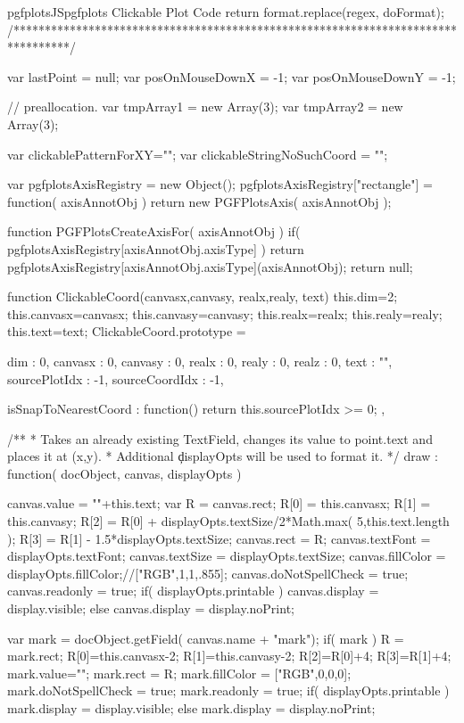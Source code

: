 {{\begin{insDLJS}[processAnnotatedPlot]{pgfplotsJS}{pgfplots Clickable Plot Code}
{    return format.replace(regex, doFormat);
}
/*********************************************************************************/


var lastPoint = null;
var posOnMouseDownX = -1;
var posOnMouseDownY = -1;

// preallocation.
var tmpArray1 = new Array(3);
var tmpArray2 = new Array(3);

var clickablePatternForXY="";
var clickableStringNoSuchCoord = "";

var pgfplotsAxisRegistry = new Object();
pgfplotsAxisRegistry["rectangle"] = function( axisAnnotObj ) {
	return new PGFPlotsAxis( axisAnnotObj );
}

function PGFPlotsCreateAxisFor( axisAnnotObj )
{
	if( pgfplotsAxisRegistry[axisAnnotObj.axisType] )
		return pgfplotsAxisRegistry[axisAnnotObj.axisType](axisAnnotObj);
	return null;
}

function ClickableCoord(canvasx,canvasy, realx,realy, text)
{
	this.dim=2;
	this.canvasx=canvasx;
	this.canvasy=canvasy;
	this.realx=realx;
	this.realy=realy;
	this.text=text;
}
ClickableCoord.prototype = 
{
	dim : 0,
	canvasx : 0,
	canvasy : 0,
	realx : 0,
	realy : 0,
	realz : 0,
	text : "",
	sourcePlotIdx : -1,
	sourceCoordIdx : -1,

	isSnapToNearestCoord : function() {
		return this.sourcePlotIdx >= 0;
	},

	/**
	 * Takes an already existing TextField, changes its value to point.text and places it at (x,y).
	 * Additional \c displayOpts will be used to format it.
	 */
	draw : function( docObject, canvas, displayOpts )
	{
		canvas.value = ""+this.text;
		var R = canvas.rect;
		R[0] = this.canvasx;
		R[1] = this.canvasy;
		R[2] = R[0] + displayOpts.textSize/2*Math.max( 5,this.text.length );
		R[3] = R[1] - 1.5*displayOpts.textSize;
		canvas.rect = R;
		canvas.textFont = displayOpts.textFont;
		canvas.textSize = displayOpts.textSize;
		canvas.fillColor = displayOpts.fillColor;//["RGB",1,1,.855];
		canvas.doNotSpellCheck = true;
		canvas.readonly = true;
		if( displayOpts.printable )
			canvas.display = display.visible;
		else
			canvas.display = display.noPrint;
		
		var mark = docObject.getField( canvas.name + "mark");
		if( mark ) {
			R = mark.rect;
			R[0]=this.canvasx-2;
			R[1]=this.canvasy-2;
			R[2]=R[0]+4;
			R[3]=R[1]+4;
			mark.value="";
			mark.rect = R;
			mark.fillColor = ["RGB",0,0,0];
			mark.doNotSpellCheck = true;
			mark.readonly = true;
			if( displayOpts.printable )
				mark.display = display.visible;
			else
				mark.display = display.noPrint;
		}
	}
}




\end{insDLJS}}}
